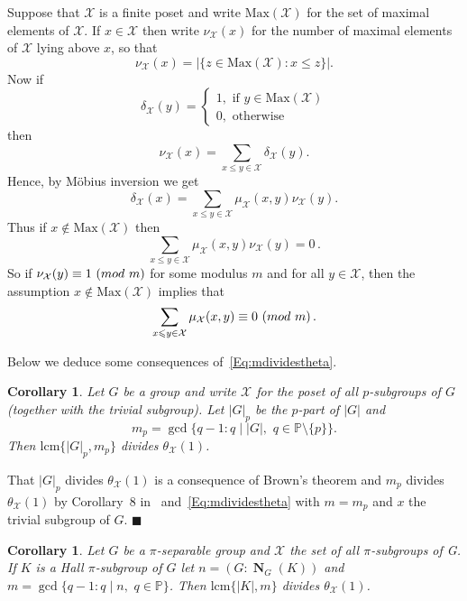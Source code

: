 \documentclass[10pt,a4paper]{amsart}
\numberwithin{equation}{section}
\DeclareMathOperator{\N}{\mathbf{N}}
\newcommand{\card}[1]{\left\lvert{#1}\right\rvert}
\renewcommand{\leq}{\leqslant}
\newcommand{\md}[1]{\,\left(\textnormal{mod}\ #1\right)}
\newenvironment{proofof}{{\bf {Proof.} }}{\hfill $\blacksquare$ \\}
\newtheorem{corollary}[theorem]{Corollary}
\begin{document}
Suppose that $\mathcal{X}$ is a finite poset and write $\mathrm{Max}(\mathcal{X})$ for the set of maximal elements of $\mathcal{X}$. 
If $x \in \mathcal{X}$ then write $\nu_{\mathcal{X}}(x)$ 
for the number of maximal elements of $\mathcal{X}$ lying above $x$, so that
\[
\nu_{\mathcal{X}}(x) = \card{\{ z \in \mathrm{Max}(\mathcal{X}) : x \leq z\}}.
\]
Now if 
\[
\delta_{\mathcal{X}}(y) = \left\{\begin{array}{l}
1, \text { if } y \in \mathrm{Max}(\mathcal{X})\\
0, \text { otherwise }
\end{array}\right.
\]
then  
\[
\nu_{\mathcal{X}}(x) = \sum_{x \leq y  \in \mathcal{X}} \delta_{\mathcal{X}}(y).
\]
Hence, by M\"{o}bius inversion we get
\[
\delta_{\mathcal{X}}(x)= \sum_{x \leq y \in \mathcal{X}}\mu_{\mathcal{X}}(x, y) \nu_{\mathcal{X}}(y).
\]
Thus if $x \notin \mathrm{Max}(\mathcal{X})$ then 
\[
\sum_{x \leq y \in \mathcal{X}}\mu_{\mathcal{X}}(x, y) \nu_{\mathcal{X}}(y) = 0\,.
\]
So if $\nu_{\mathcal{X}}(y) \equiv 1 \md{m}$ for some modulus $m$ and for all $y \in \mathcal{X}$, 
then the assumption $x \notin \mathrm{Max}(\mathcal{X})$ implies that
\begin{equation}\label{Eq:mdividestheta}
\sum_{x \leq y \in \mathcal{X} }\mu_{\mathcal{X}}(x, y) \equiv 0 \md{m}.    
\end{equation}

Below we deduce some consequences  of~\eqref{Eq:mdividestheta}.


\begin{corollary}\label{Cor:First}
Let $G$ be a group and write $\mathcal{X}$ for the poset of all $p$-subgroups of $G$
(together with the trivial subgroup).
Let $\card{G}_p$ be the $p$-part of $|G|$ 
and 
\[
m_p = \gcd\{q - 1 : q \mid \card{G},\,\,q \in \mathbb{P}\setminus \{p\}\}.
\]
Then $\mathrm{lcm}\{\card{G}_p, m_p\}$ divides $\theta_{\mathcal{X}}(1)$.
\end{corollary}

\begin{proofof}
That $\card{G}_p$ divides $\theta_{\mathcal{X}}(1)$ is a consequence of Brown's theorem
and $m_p$ divides $\theta_{\mathcal{X}}(1)$ 
by Corollary~8 in~\cite{congruences} and~\eqref{Eq:mdividestheta} with $m = m_p$
and $x$ the trivial subgroup of $G$.
\end{proofof}

\begin{corollary}\label{Cor:Second}
Let $G$ be a $\pi$-separable group and  $\mathcal{X}$  the set of all $\pi$-subgroups of G. If  $K$  is a Hall $\pi$-subgroup of $G$ let $n = (G : \N_G(K))$ and $m = \gcd\{q - 1 : q \mid n,\,\, q \in \mathbb{P}\}$.
Then $\mathrm{lcm}\{|K|, m\}$ divides $\theta_{\mathcal{X}}(1)$.
\end{corollary}
\end{document}
